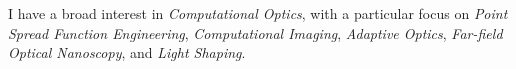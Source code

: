 I have a broad interest in \textit{Computational Optics}, with a particular focus on \textit{Point Spread Function Engineering}, \textit{Computational Imaging}, \textit{Adaptive Optics}, \textit{Far-field Optical Nanoscopy}, and \textit{Light Shaping}.